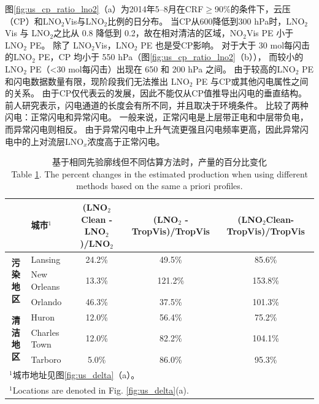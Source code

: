 图\ref{fig:us_cp_ratio_lno2}（a）为2014年5--8月在CRF$\geq$90\%的条件下，云压（CP）和LNO$_2$Vis与LNO$_2$比例的日分布。
当CP从600降低到300 hPa时，LNO$_2$Vis 与 LNO$_2$之比从 0.8 降低到 0.2，故在相对清洁的区域，NO$_2$Vis PE 小于 LNO$_2$ PE。
除了 LNO$_2$Vis，LNO$_2$ PE 也是受CP影响。
对于大于 30 mol每闪击的LNO$_2$ PE，CP 均小于 550 hPa（图\ref{fig:us_cp_ratio_lno2}（b）），
而较小的 LNO$_2$ PE（<30 mol每闪击）出现在 650 和 200 hPa 之间。
由于较高的LNO$_2$ PE 和闪电数据数量有限，现阶段我们无法推出 LNO$_2$ PE 与CP或其他闪电属性之间的关系。
由于CP仅代表云的发展，因此不能仅从CP值推导出闪电的垂直结构。
前人研究表示，闪电通道的长度会有所不同，并且取决于环境条件\citep{Carey.2016,Mecikalski.2017,Fuchs.2018}。
\citet{Davis.2019}比较了两种闪电：正常闪电和异常闪电。
一般来说，正常闪电是上层带正电和中层带负电，而异常闪电则相反\citep{Williams.1989}。
由于异常闪电中上升气流更强且闪电频率更高，因此异常闪电中的上对流层LNO$_x$浓度高于正常闪电。


\begin{table}[htbp]
\scriptsize
\caption{基于相同先验廓线但不同估算方法时，产量的百分比变化\\Table \ref{table:production_comp}. The percent changes in the estimated production when using different methods based on the same a priori profiles.}
\begin{tabular}{clccc}
\hline
\textbf{} & \textbf{城市$^1$} & \textbf{(LNO$_\textrm{2}$Clean - LNO$_\textrm{2}$)/LNO$_\textrm{2}$} & \textbf{(LNO$_\textrm{2}$ - TropVis)/TropVis} & \textbf{(LNO$_\textrm{2}$Clean-TropVis)/TropVis} \\
\hline
\multirow{3}{*}{\textbf{污染地区}} & Lansing          & 24.2\%  & 49.5\%   & 85.6\%   \\
                                   & New Orleans      & 13.3\%  & 121.2\%  & 153.8\%  \\
                                   & Orlando          & 46.3\%  & 37.5\%   & 101.3\%  \\
\hline
\multirow{3}{*}{\textbf{清洁地区}}    & Huron            & 12.0\%  & 56.4\%   & 75.2\%   \\
                                   & Charles Town     & 12.0\%  & 82.2\%   & 104.1\%  \\
                                   & Tarboro          & 5.0\%   & 86.0\%   & 95.3\%   \\
\hline
\multicolumn{5}{l}{$^1$城市地址见图\ref{fig:us_delta}（a）。}\\
\multicolumn{5}{l}{$^1$Locations are denoted in Fig. \ref{fig:us_delta}(a).}
\end{tabular}
\label{table:production_comp}
\end{table}

